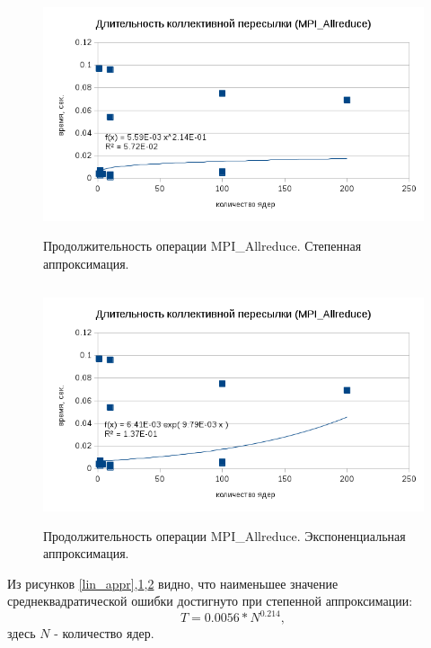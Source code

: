         
        \begin{figure}[htb]
        	\begin{center}
        		\includegraphics[height=7cm,keepaspectratio]{images/RomanenkoAASnytnikovAVChernykhIGadaptationtosupercomputerfinalEXTENDEDREFERENCES-img3.png}
        	\end{center}
        	\caption{Продолжительность операции MPI\_Allreduce. Степенная аппроксимация.}
        	\label{power_appr}
        \end{figure}
        
       
       
       \begin{figure}[htb]
       	\begin{center}
       		\includegraphics[height=7cm,keepaspectratio]{images/RomanenkoAASnytnikovAVChernykhIGadaptationtosupercomputerfinalEXTENDEDREFERENCES-img4.png}
       	\end{center}
       	\caption{Продолжительность операции MPI\_Allreduce. Экспоненциальная аппроксимация.}
       	\label{exp_appr}
       \end{figure} 
        Из рисунков \ref{lin_appr},\ref{power_appr},\ref{exp_appr} видно, что наименьшее значение среднеквадратической ошибки достигнуто при степенной аппроксимации:
        $$
        T = 0.0056*N^{0.214},
        $$
        здесь $N$ - количество ядер.
        \clearpage
        
